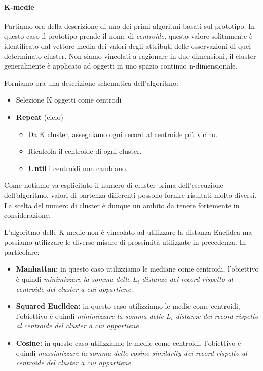 \paragraph{K-medie}

Partiamo ora della descrizione di uno dei primi algoritmi basati sul prototipo. In questo caso il prototipo prende il nome di \textit{centroide,} questo valore solitamente è identificato dal vettore media dei valori degli attributi delle osservazioni di quel determinato cluster. Non siamo vincolati a ragionare in due dimensioni, il cluster generalmente è applicato ad oggetti in uno spazio continuo n-dimensionale.

Forniamo ora una descrizione schematica dell'algoritmo:
\begin{itemize}
	\item Selezione K oggetti come centrodi
	\item \textbf{Repeat} (ciclo)
	\begin{itemize}
		\item Da K cluster, assegniamo ogni record al centroide più vicino.
		\item Ricalcola il centroide di ogni cluster.
		\item \textbf{Until} i centroidi non cambiano.
	\end{itemize}
	
\end{itemize}

Come notiamo va esplicitato il numero di cluster prima dell'esecuzione dell'algoritmo,  valori di partenza differenti possono fornire risultati molto diversi. La scelta del numero di cluster è dunque un ambito da tenere fortemente in considerazione.

L'algoritmo delle K-medie non è vincolato ad utilizzare la distanza Euclidea ma possiamo utilizzare le diverse misure di prossimità utilizzate in precedenza. In particolare:

\begin{itemize}
	\item \textbf{Manhattan:} in questo caso utilizziamo le mediane come centroidi, l'obiettivo è quindi \textit{minimizzare la somma delle $L_{i}$ distanze dei record rispetto al centroide del cluster a cui appartiene.}
	\item \textbf{Squared Euclidea:} in questo caso utilizziamo le medie come centroidi, l'obiettivo è quindi \textit{minimizzare la somma delle $L_{i}$ distanze dei record rispetto al centroide del cluster a cui appartiene.}
	\item \textbf{Cosine:} in questo caso utilizziamo le medie come centroidi, l'obiettivo è quindi \textit{massimizzare la somma delle cosine similarity dei record rispetto al centroide del cluster a cui appartiene.}
\end{itemize}


